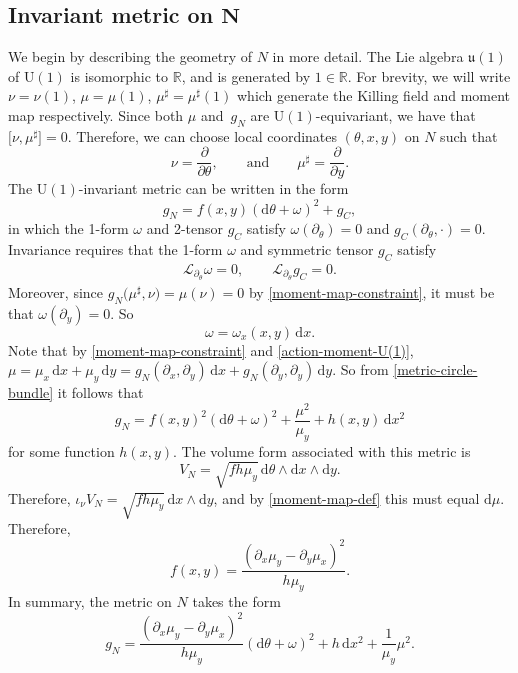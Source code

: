 \documentclass[pdftex]{sigma}
\newcommand{\uu}{\mathfrak{u}}
\newcommand{\U}{{\mathrm{U}}}
\newcommand{\R}{{\mathbb{R}}}
\newcommand{\1}{{\mathbb{1}}}
\newcommand{\bdy}{\partial}
\def \d{\mathrm{d}}
\numberwithin{equation}{section}
\begin{document}
\subsection[Invariant metric on N]{Invariant metric on $\boldsymbol{N}$}

We begin by describing the geometry of $N$ in more detail. The Lie algebra $\uu(1)$ of $\U(1)$ is isomorphic to $\R$, and is generated by $1\in\R$. For brevity, we will write $\nu=\nu(1)$, $\mu=\mu(1)$, $\mu^\sharp=\mu^\sharp(1)$ which generate the Killing field and moment map respectively. Since both $\mu$ and~$g_N$ are $\U(1)$-equivariant, we have that $\big[\nu,\mu^\sharp\big]=0$. Therefore, we can choose local coordinates $(\theta,x,y)$ on $N$ such that
\begin{equation}\label{action-moment-U(1)}
\nu = \frac{\partial}{\partial\theta},\qquad\text{and}\qquad \mu^\sharp=\frac{\partial}{\partial y}.
\end{equation}
The $\U(1)$-invariant metric can be written in the form
\begin{equation}\label{metric-circle-bundle}
g_N = f(x,y)(\d\theta+\omega)^2 + g_C,
\end{equation}
in which the 1-form $\omega$ and 2-tensor $g_C$ satisfy $\omega(\partial_\theta)=0$ and $g_C(\partial_\theta,\cdot)=0$. Invariance requires that the 1-form $\omega$ and symmetric tensor $g_C$ satisfy
\begin{align*}
 \mathcal{L}_{\partial_\theta}\omega=0,\qquad \mathcal{L}_{\partial_\theta}g_C=0.
\end{align*}
Moreover, since $g_N\big(\mu^\sharp,\nu\big)=\mu(\nu)=0$ by \eqref{moment-map-constraint}, it must be that $\omega(\partial_y)=0$. So
\begin{equation*}
\omega=\omega_x(x,y)\,\d x.
\end{equation*}
Note that by \eqref{moment-map-constraint} and \eqref{action-moment-U(1)}, $\mu=\mu_x\,\d x+\mu_y\,\d y=g_N(\bdy_x,\bdy_y)\,\d x+g_N(\bdy_y,\bdy_y)\,\d y$. So from \eqref{metric-circle-bundle} it follows that
\begin{equation*}
g_N = f(x,y)^2(\d\theta+\omega)^2 + \frac{\mu^2}{\mu_y} + h(x,y)\,\d x^2
\end{equation*}
for some function $h(x,y)$. The volume form associated with this metric is
\begin{equation*}
V_N = \sqrt{fh\mu_y}\,\d\theta\wedge\d x \wedge \d y.
\end{equation*}
Therefore, $\iota_\nu V_N = \sqrt{fh\mu_y}\, \d x \wedge \d y$, and by \eqref{moment-map-def} this must equal $\d\mu$. Therefore,
\begin{equation*}
f(x,y) = \frac{(\partial_x\mu_y-\partial_y\mu_x)^2}{h\mu_y}.
\end{equation*}
In summary, the metric on $N$ takes the form
\begin{equation}\label{metric-fixed-U(1)}
g_N = \frac{(\partial_x\mu_y-\partial_y\mu_x)^2}{h\mu_y}(\d\theta+\omega)^2 + h\,\d x^2 + \frac{1}{\mu_y}\mu^2.
\end{equation}
\end{document}
